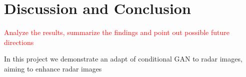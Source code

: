 \section{Discussion and Conclusion} \label{conclusion}
\textcolor{red}{
Analyze the results, summarize the findings and point out possible future directions}

In this project we demonstrate an adapt of conditional GAN to radar images, aiming to enhance radar images  